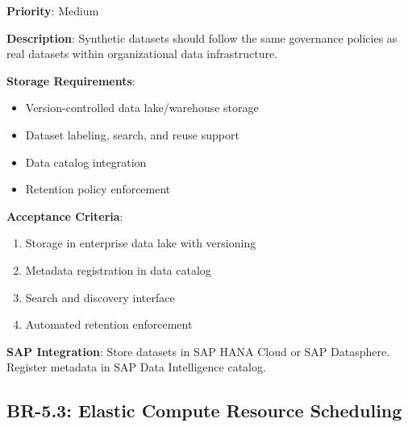 \documentclass[12pt,a4paper,twoside]{report}
\begin{document}
\begin{tcolorbox}[colback=purple!5,colframe=purple!70,title=BR-5.2: Unified Data Governance]
\textbf{Priority}: Medium

\textbf{Description}: Synthetic datasets should follow the same governance
policies as real datasets within organizational data infrastructure.

\textbf{Storage Requirements}:
\begin{itemize}
\item Version-controlled data lake/warehouse storage
\item Dataset labeling, search, and reuse support
\item Data catalog integration
\item Retention policy enforcement
\end{itemize}

\textbf{Acceptance Criteria}:
\begin{enumerate}
\item Storage in enterprise data lake with versioning
\item Metadata registration in data catalog
\item Search and discovery interface
\item Automated retention enforcement
\end{enumerate}

\textbf{SAP Integration}: Store datasets in SAP HANA Cloud or SAP Datasphere.
Register metadata in SAP Data Intelligence catalog.
\end{tcolorbox}

\subsection{BR-5.3: Elastic Compute Resource Scheduling}
\end{document}
